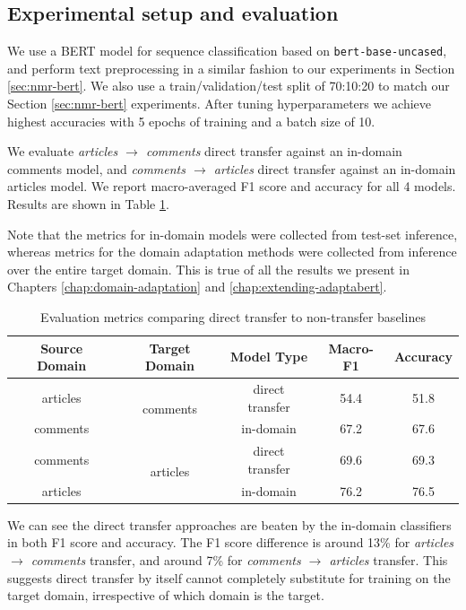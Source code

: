 \subsection{Experimental setup and evaluation}

We use a BERT model for sequence classification based on \texttt{bert-base-uncased}, and perform text preprocessing in a similar fashion to our experiments in Section \ref{sec:nmr-bert}. We also use a train/validation/test split of 70:10:20 to match our Section \ref{sec:nmr-bert} experiments. After tuning hyperparameters we achieve highest accuracies with 5 epochs of training and a batch size of 10.

We evaluate \textit{articles $ \rightarrow $ comments} direct transfer against an in-domain comments model, and \textit{comments $ \rightarrow $ articles} direct transfer against an in-domain articles model. We report macro-averaged F1 score and accuracy for all 4 models. Results are shown in Table \ref{tab:direct-transfer-results}.

Note that the metrics for in-domain models were collected from test-set inference, whereas metrics for the domain adaptation methods were collected from inference over the entire target domain. This is true of all the results we present in Chapters \ref{chap:domain-adaptation} and \ref{chap:extending-adaptabert}.

\begin{table}[ht]
    \centering
    \begin{tabular}{|c|c|c|c|c|}
        \hline
        \textbf{Source Domain} & \textbf{Target Domain} & \textbf{Model Type} & \textbf{Macro-F1} & \textbf{Accuracy} \\
        \hline
        articles & \multirow{2}{4em}{comments} & direct transfer & 54.4 & 51.8 \\
        comments & & in-domain & 67.2 & 67.6 \\
        \hline
        comments & \multirow{2}{3em}{articles} & direct transfer & 69.6 & 69.3 \\
        articles & & in-domain & 76.2 & 76.5 \\
        \hline
    \end{tabular}
    \caption{Evaluation metrics comparing direct transfer to non-transfer baselines}
    \label{tab:direct-transfer-results}
\end{table}

We can see the direct transfer approaches are beaten by the in-domain classifiers in both F1 score and accuracy. The F1 score difference is around 13\% for \textit{articles $ \rightarrow $ comments} transfer, and around 7\% for \textit{comments $ \rightarrow $ articles} transfer. This suggests direct transfer by itself cannot completely substitute for training on the target domain, irrespective of which domain is the target.


